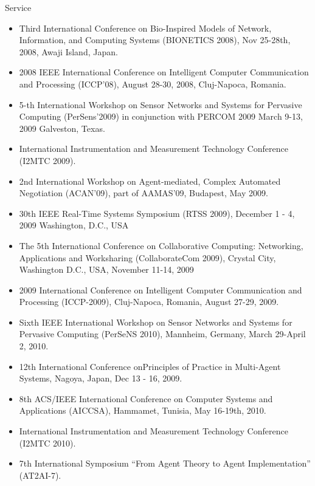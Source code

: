 \begin{category}{Service}
\begin{itemize}
\item Third International
Conference on Bio-Inspired Models of Network, Information, and Computing
Systems (BIONETICS 2008),
Nov 25-28th, 2008, Awaji Island, Japan.

\item 2008 IEEE International
Conference on Intelligent Computer Communication
and Processing (ICCP'08), August 28-30, 2008, Cluj-Napoca, Romania.

\item 5-th International Workshop
on Sensor Networks and Systems for Pervasive Computing (PerSens'2009)
in conjunction with PERCOM 2009 March 9-13, 2009 Galveston, Texas.

\item International Instrumentation and
Measurement Technology Conference (I2MTC 2009).

\item 2nd International Workshop on Agent-mediated, Complex Automated Negotiation (ACAN'09), part of AAMAS'09, Budapest, May 2009.

\item 30th IEEE Real-Time Systems Symposium (RTSS 2009), December 1 - 4, 2009 Washington, D.C., USA

\item The 5th International Conference on Collaborative Computing:
Networking, Applications and Worksharing (CollaborateCom 2009),
Crystal City, Washington D.C., USA, November 11-14, 2009

\item 2009 International Conference on Intelligent
Computer Communication and Processing (ICCP-2009), Cluj-Napoca, Romania,
August 27-29, 2009.

\item Sixth IEEE International Workshop
on Sensor Networks and Systems for Pervasive Computing (PerSeNS 2010), Mannheim,
Germany, March 29-April 2, 2010.

\item 12th International Conference onPrinciples of Practice in Multi-Agent Systems, Nagoya, Japan, Dec 13 - 16, 2009.

\item 8th ACS/IEEE International Conference on Computer Systems and Applications (AICCSA), Hammamet, Tunisia, May 16-19th, 2010.

\item International Instrumentation and
Measurement Technology Conference (I2MTC 2010).

\item 7th International
Symposium ``From Agent Theory to Agent Implementation'' (AT2AI-7).


\end{itemize}
\end{category}
